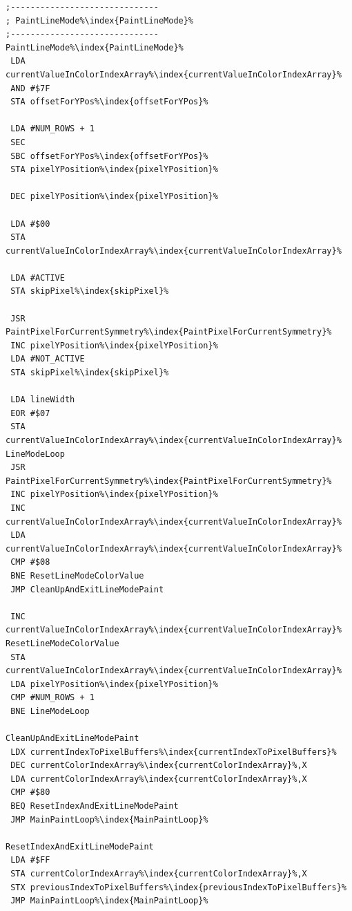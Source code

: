 \hspace{-0.1cm}
\begin{minipage}[b]{0.33\linewidth}
\begin{lrbox}{\mybox}%
\begin{lstlisting}[basicstyle=\ttfamily\tiny,escapechar=\%]
;------------------------------
; PaintLineMode%\index{PaintLineMode}%
;------------------------------
PaintLineMode%\index{PaintLineMode}%
 LDA currentValueInColorIndexArray%\index{currentValueInColorIndexArray}%
 AND #$7F
 STA offsetForYPos%\index{offsetForYPos}%

 LDA #NUM_ROWS + 1
 SEC
 SBC offsetForYPos%\index{offsetForYPos}%
 STA pixelYPosition%\index{pixelYPosition}%

 DEC pixelYPosition%\index{pixelYPosition}%

 LDA #$00
 STA currentValueInColorIndexArray%\index{currentValueInColorIndexArray}%

 LDA #ACTIVE
 STA skipPixel%\index{skipPixel}%

 JSR PaintPixelForCurrentSymmetry%\index{PaintPixelForCurrentSymmetry}%
 INC pixelYPosition%\index{pixelYPosition}%
 LDA #NOT_ACTIVE
 STA skipPixel%\index{skipPixel}%

 LDA lineWidth
 EOR #$07
 STA currentValueInColorIndexArray%\index{currentValueInColorIndexArray}%
LineModeLoop
 JSR PaintPixelForCurrentSymmetry%\index{PaintPixelForCurrentSymmetry}%
 INC pixelYPosition%\index{pixelYPosition}%
 INC currentValueInColorIndexArray%\index{currentValueInColorIndexArray}%
 LDA currentValueInColorIndexArray%\index{currentValueInColorIndexArray}%
 CMP #$08
 BNE ResetLineModeColorValue
 JMP CleanUpAndExitLineModePaint

 INC currentValueInColorIndexArray%\index{currentValueInColorIndexArray}%
ResetLineModeColorValue
 STA currentValueInColorIndexArray%\index{currentValueInColorIndexArray}%
 LDA pixelYPosition%\index{pixelYPosition}%
 CMP #NUM_ROWS + 1
 BNE LineModeLoop

CleanUpAndExitLineModePaint
 LDX currentIndexToPixelBuffers%\index{currentIndexToPixelBuffers}%
 DEC currentColorIndexArray%\index{currentColorIndexArray}%,X
 LDA currentColorIndexArray%\index{currentColorIndexArray}%,X
 CMP #$80
 BEQ ResetIndexAndExitLineModePaint
 JMP MainPaintLoop%\index{MainPaintLoop}%

ResetIndexAndExitLineModePaint
 LDA #$FF
 STA currentColorIndexArray%\index{currentColorIndexArray}%,X
 STX previousIndexToPixelBuffers%\index{previousIndexToPixelBuffers}%
 JMP MainPaintLoop%\index{MainPaintLoop}%


\end{lstlisting}
\end{lrbox}
\end{minipage}
